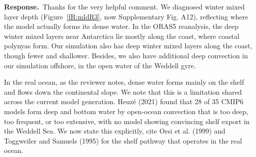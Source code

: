 \documentclass[11pt,a4paper]{article}
\newcommand{\response}{\par\noindent\color{chgcol}\textbf{Response.}\ }
\begin{document}


\response Thanks for the very helpful comment.  We diagnosed winter mixed layer depth (Figure~\ref{fR:mldR3}, now Supplementary Fig. A12), reflecting where the model actually forms its dense water. In the ORAS5 reanalysis, the deep winter mixed layers near Antarctica lie mostly along the coast, where coastal polynyas form. Our simulation also has deep winter mixed layers along the coast, though fewer and shallower.  Besides, we also have additional deep convection in our simulation offshore, in the open water of the Weddell gyre. 

In the real ocean, as the reviewer notes, dense water forms mainly on the shelf and flows down the continental slope. We note that this is a limitation shared across the current model generation. Heuzé (2021) found that 28 of 35 CMIP6 models form deep and bottom water by open-ocean convection that is too deep, too frequent, or too extensive, with no model showing convincing shelf export in the Weddell Sea. We now state this explicitly, cite Orsi et al. (1999) and Toggweiler and Samuels (1995) for the shelf pathway that operates in the real ocean. 
\end{document}
